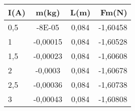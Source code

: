 \begin{tabular}{|l|c|c|r|}
\hline
I(A)	&m(kg)	&L(m)	&Fm(N)\\ \hline
0,5	&-8E-05	&0,084	&-1,60458\\
1	&-0,00015	&0,084	&-1,60528\\
1,5	&-0,00023	&0,084	&-1,60608\\
2	&-0,0003	&0,084	&-1,60678\\
2,5	&-0,00036	&0,084	&-1,60738\\
3	&-0,00043	&0,084	&-1,60808\\ \hline
\end{tabular}
